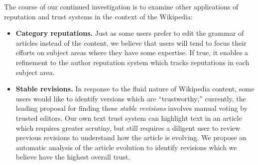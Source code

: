 The course of our continued investigation is to examine
other applications of reputation and trust systems in
the context of the Wikipedia:
\begin{itemize}
\item \textbf{Category reputations.}
    Just as some users prefer to edit the grammar of
    articles instead of the content, we believe that
    users will tend to focus their efforts on subject
    areas where they have some expertise.
    If true, it enables a refinement to the author
    reputation system which tracks reputations in
    each subject area.

\item \textbf{Stable revisions.}
    In response to the fluid nature of Wikipedia content,
    some users would like to identify versions which
    are ``trustworthy;'' currently, the leading proposal
    for finding these \textit{stable revisions}
    involves manual voting by trusted editors.
    Our own text trust system can highlight text in
    an article which requires greater scrutiny, but
    still requires a diligent user to review previous
    revisions to understand how the article is evolving.
    We propose an automatic analysis of the article evolution
    to identify revisions which we believe
    have the highest overall trust.

\begin{comment}

\item \textbf{Improve resistance to attacks.}
    Integrating our reputation and trust systems into the
    Wikipedia requires that they be able to withstand
    attacks, particularly \intro{Sybil attacks} where a user
    coordinates multiple identities to gain
    reputation~\cite{Douceur02,Sybil05,TrustSybil05}.
    Attacks can be made on the author attribution,
    user reputation and text trust systems,
    making this an important aspect to address
    if our results are to be useful on a live site.


\item \textbf{Applications of reputation and trust.}
    Currently, the Wikipedia shows every user the latest version
    of an article by default; our systems can be used instead to show
    the most trustworthy recent version.
    We can also look at various user dynamics and how reputation
    changes; for example, whether users appear to restrict
    themselves to categories of expertise, can we identify
    domain experts, and whether participating
    in an edit war affects the likelihood of leaving the community.

\end{comment}

\end{itemize}

